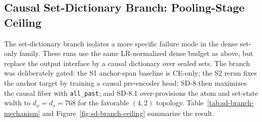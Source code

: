 \documentclass{article}
\theoremstyle{plain}
\theoremstyle{definition}
\theoremstyle{remark}
\begin{document}
\subsection{Causal Set-Dictionary Branch: Pooling-Stage Ceiling}
\label{sec:results-set-dictionary}

The set-dictionary branch isolates a more specific failure mode in the dense
set-only family.  These runs use the same LR-normalized dense budget as above,
but replace the output interface by a causal dictionary over sealed sets.  The
branch was deliberately gated: the S1 anchor-span baseline is CE-only; the S2
rerun fixes the anchor target by training a causal pre-encoder head; SD-8 then
maximizes the causal fiber with \texttt{all\_past}; and SD-8.1 over-provisions
the atom and set-state width to $d_\phi=d_s=768$ for the favorable $(4,2)$
topology.  Table~\ref{tab:sd-branch-mechanism} and
Figure~\ref{fig:sd-branch-ceiling} summarize the result.
\end{document}
